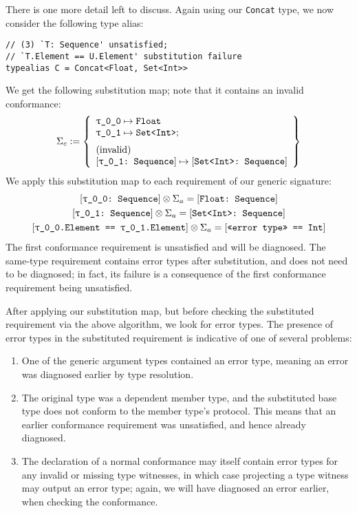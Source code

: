 \documentclass[../generics]{subfiles}
\begin{document}
\begin{example}
There is one more detail left to discuss. Again using our \texttt{Concat} type, we now consider the following type alias:
\begin{Verbatim}
// (3) `T: Sequence' unsatisfied;
// `T.Element == U.Element' substitution failure
typealias C = Concat<Float, Set<Int>>
\end{Verbatim}
We get the following substitution map; note that it contains an invalid conformance:
\[
\Sigma_c := \SubstMapLongC{
\SubstType{\rT}{Float}\\
\SubstType{\rU}{Set<Int>}
}{
\mbox{(invalid)}\\
\SubstConf{\rU}{Set<Int>}{Sequence}
}
\]
We apply this substitution map to each requirement of our generic signature:
\begin{gather*}
\ConfReq{\rT}{Sequence}\otimes\Sigma_a = \ConfReq{Float}{Sequence}\\
\ConfReq{\rU}{Sequence}\otimes\Sigma_a = \ConfReq{Set<Int>}{Sequence}\\
\SameReq{\rT.Element}{\rU.Element}\otimes\Sigma_a = \SameReq{<<error type>>}{Int}
\end{gather*}
The first conformance requirement is unsatisfied and will be diagnosed. The same-type requirement contains error types after substitution, and does not need to be diagnosed; in fact, its failure is a consequence of the first conformance requirement being unsatisfied.
\end{example}
After applying our substitution map, but before checking the substituted requirement via the above algorithm, we look for error types. The presence of error types in the substituted requirement is indicative of one of several problems:
\begin{enumerate}
\item One of the generic argument types contained an error type, meaning an error was diagnosed earlier by type resolution.
\item The original type was a dependent member type, and the substituted base type does not conform to the member type's protocol. This means that an earlier conformance requirement was unsatisfied, and hence already diagnosed.
\item The declaration of a normal conformance may itself contain error types for any invalid or missing type witnesses, in which case projecting a type witness may output an error type; again, we will have diagnosed an error earlier, when checking the conformance.
\end{enumerate}
\end{document}
